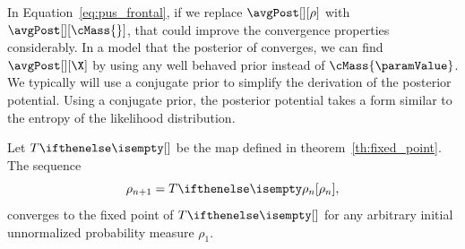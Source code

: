 In Equation~\ref{eq:pus_frontal}, if we replace $\avgPost[][\rho]$ with $\avgPost[][\cMass{}]$, that could improve the
convergence properties considerably.
In a model that the posterior of \X converges, we can find $\avgPost[][\X]$ by using any well behaved prior
instead of $\cMass{\paramValue}$.
We typically will use a conjugate prior to simplify the derivation of the posterior potential.
Using a conjugate prior, the posterior potential takes a form similar to the entropy of the likelihood distribution.

\begin{theorem}
    Let $\fpMap{}$ be the map defined in theorem~\ref{th:fixed_point}.
    The sequence \[\rho_{n+1} = \fpMap{\rho_n},\] converges to the fixed point of
    $\fpMap{}$ for any arbitrary initial unnormalized probability measure $\rho_1$.
\end{theorem}

